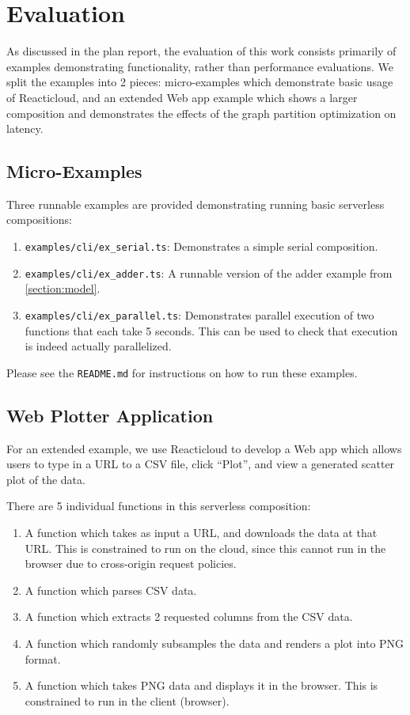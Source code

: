 \documentclass[10pt,sigplan,screen,nonacm]{acmart}
\begin{document}
\section{Evaluation}
As discussed in the plan report, the evaluation of this work
consists primarily of examples demonstrating functionality,
rather than performance evaluations.
We split the examples into 2 pieces: micro-examples which demonstrate
basic usage of Reacticloud, and an extended Web app
example which shows a larger composition and demonstrates
the effects of the graph partition optimization on latency.

\subsection{Micro-Examples}
Three runnable examples are provided demonstrating running
basic serverless compositions:
\begin{enumerate}
	\item \texttt{examples/cli/ex\_serial.ts}: Demonstrates a simple serial composition.
	\item \texttt{examples/cli/ex\_adder.ts}: A runnable version of the adder example from \cref{section:model}.
	\item \texttt{examples/cli/ex\_parallel.ts}: Demonstrates parallel execution of two functions that each take 5 seconds. 
		This can be used to check that execution is indeed actually parallelized.
\end{enumerate}
Please see the \texttt{README.md} for instructions on how to run these examples.


\subsection{Web Plotter Application}
For an extended example, we use Reacticloud to develop
a Web app which allows users to type in a URL to a CSV file,
click ``Plot'', and view a generated scatter plot of the data.

There are 5 individual functions in this serverless composition:
\begin{enumerate}
	\item A function which takes as input a URL, and downloads the data at that URL. 
		This is constrained to run on the cloud, since this cannot run in the browser
		due to cross-origin request policies.
	\item A function which parses CSV data.
	\item A function which extracts 2 requested columns from the CSV data.
	\item A function which randomly subsamples the data and renders a plot into PNG format.
	\item A function which takes PNG data and displays it in the browser.
		This is constrained to run in the client (browser).
\end{enumerate}
\end{document}
